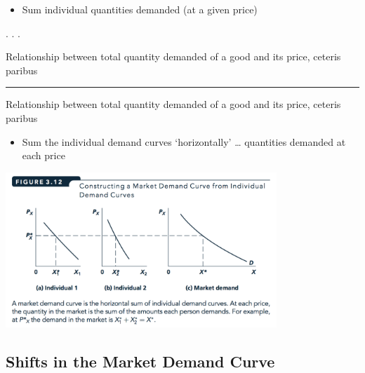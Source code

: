 \documentclass[]{article}
\providecommand{\tightlist}{%
  \setlength{\itemsep}{0pt}\setlength{\parskip}{0pt}}
\begin{document}
\begin{itemize}
\tightlist
\item
  Sum individual quantities demanded (at a given price)
\end{itemize}

. . .

\begin{description}
\tightlist
\item[Market demand curve]
Relationship between total quantity demanded of a good and its price,
ceteris paribus
\end{description}


\begin{center}\rule{0.5\linewidth}{\linethickness}\end{center}

\begin{description}
\tightlist
\item[Market demand curve]
Relationship between total quantity demanded of a good and its price,
ceteris paribus
\end{description}

\begin{itemize}
\tightlist
\item
  Sum the individual demand curves `horizontally' \ldots{} quantities
  demanded at each price
\end{itemize}

\includegraphics[height=2.3in]{picsfigs/summarketdemandcurve.png}


\hypertarget{shifts-in-the-market-demand-curve}{%
\subsection{Shifts in the Market Demand
Curve}\label{shifts-in-the-market-demand-curve}}
\end{document}
